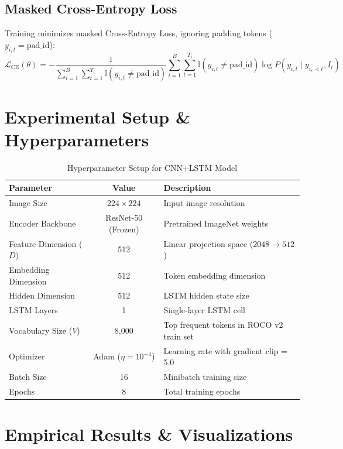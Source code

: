 \documentclass[11pt,a4paper]{article}
\begin{document}
\subsection{Masked Cross-Entropy Loss}
Training minimizes masked Cross-Entropy Loss, ignoring padding tokens ($y_{i,t} = \text{pad\_id}$):
\begin{equation}
\mathcal{L}_{\text{CE}}(\theta) = -\frac{1}{\sum_{i=1}^B \sum_{t=1}^{T_i} \mathbb{I}(y_{i,t} \neq \text{pad\_id})} \sum_{i=1}^B \sum_{t=1}^{T_i} \mathbb{I}(y_{i,t} \neq \text{pad\_id}) \log P(y_{i,t} \mid y_{i,<t}, I_i)
\end{equation}

\section{Experimental Setup \& Hyperparameters}

\begin{table}[H]
\centering
\caption{Hyperparameter Setup for CNN+LSTM Model}
\begin{tabular}{lcl}
\toprule
\textbf{Parameter} & \textbf{Value} & \textbf{Description} \\
\midrule
Image Size & $224 \times 224$ & Input image resolution \\
Encoder Backbone & ResNet-50 (Frozen) & Pretrained ImageNet weights \\
Feature Dimension ($D$) & 512 & Linear projection space ($2048 \rightarrow 512$) \\
Embedding Dimension & 512 & Token embedding dimension \\
Hidden Dimension & 512 & LSTM hidden state size \\
LSTM Layers & 1 & Single-layer LSTM cell \\
Vocabulary Size ($V$) & 8,000 & Top frequent tokens in ROCO v2 train set \\
Optimizer & Adam ($\eta = 10^{-4}$) & Learning rate with gradient clip = 5.0 \\
Batch Size & 16 & Minibatch training size \\
Epochs & 8 & Total training epochs \\
\bottomrule
\end{tabular}
\end{table}

\section{Empirical Results \& Visualizations}
\end{document}
